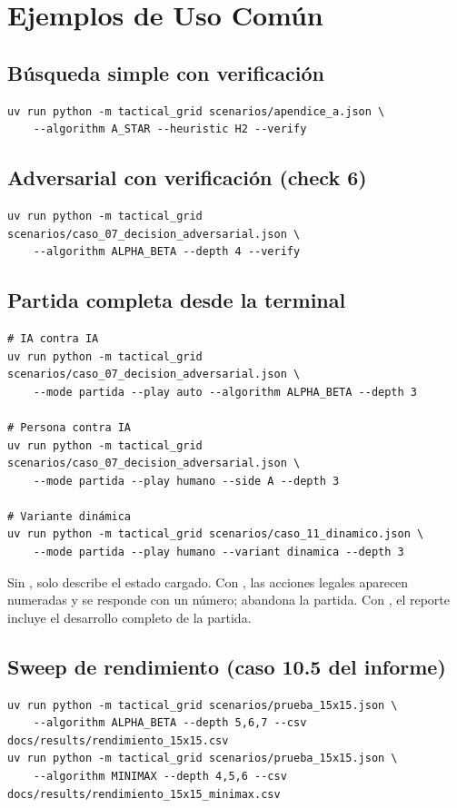 
\section{Ejemplos de Uso Común}
\label{sec:cli-ejemplos}

\subsection{Búsqueda simple con verificación}
\begin{verbatim}
uv run python -m tactical_grid scenarios/apendice_a.json \
    --algorithm A_STAR --heuristic H2 --verify
\end{verbatim}

\subsection{Adversarial con verificación (check 6)}
\begin{verbatim}
uv run python -m tactical_grid scenarios/caso_07_decision_adversarial.json \
    --algorithm ALPHA_BETA --depth 4 --verify
\end{verbatim}

\subsection{Partida completa desde la terminal}
\begin{verbatim}
# IA contra IA
uv run python -m tactical_grid scenarios/caso_07_decision_adversarial.json \
    --mode partida --play auto --algorithm ALPHA_BETA --depth 3

# Persona contra IA
uv run python -m tactical_grid scenarios/caso_07_decision_adversarial.json \
    --mode partida --play humano --side A --depth 3

# Variante dinámica
uv run python -m tactical_grid scenarios/caso_11_dinamico.json \
    --mode partida --play humano --variant dinamica --depth 3
\end{verbatim}

Sin \code{--play},  solo describe el estado cargado. Con
\code{--play humano}, las acciones legales aparecen numeradas y se responde con un número;
\code{q} abandona la partida. Con \code{--play auto}, el reporte incluye el desarrollo completo
de la partida.

\subsection{Sweep de rendimiento (caso 10.5 del informe)}
\begin{verbatim}
uv run python -m tactical_grid scenarios/prueba_15x15.json \
    --algorithm ALPHA_BETA --depth 5,6,7 --csv docs/results/rendimiento_15x15.csv
uv run python -m tactical_grid scenarios/prueba_15x15.json \
    --algorithm MINIMAX --depth 4,5,6 --csv docs/results/rendimiento_15x15_minimax.csv
\end{verbatim}

